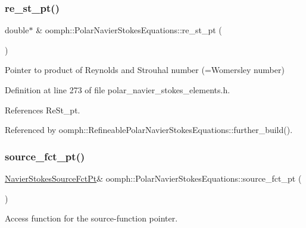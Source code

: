 \subsubsection{\texorpdfstring{re\+\_\+st\+\_\+pt()}{re\_st\_pt()}}
{\footnotesize\ttfamily double$\ast$ \& oomph\+::\+Polar\+Navier\+Stokes\+Equations\+::re\+\_\+st\+\_\+pt (\begin{DoxyParamCaption}{ }\end{DoxyParamCaption})\hspace{0.3cm}{\ttfamily [inline]}}



Pointer to product of Reynolds and Strouhal number (=Womersley number) 



Definition at line 273 of file polar\+\_\+navier\+\_\+stokes\+\_\+elements.\+h.



References Re\+St\+\_\+pt.



Referenced by oomph\+::\+Refineable\+Polar\+Navier\+Stokes\+Equations\+::further\+\_\+build().

\mbox{\label{classoomph_1_1PolarNavierStokesEquations_a81a9738dda601340f31fe0a3c6d4ceff}} 
\subsubsection{\texorpdfstring{source\+\_\+fct\+\_\+pt()}{source\_fct\_pt()}\hspace{0.1cm}{\footnotesize\ttfamily [1/2]}}
{\footnotesize\ttfamily \hyperlink{classoomph_1_1PolarNavierStokesEquations_a9084ecf962b26ccaa72443a807dedb25}{Navier\+Stokes\+Source\+Fct\+Pt}\& oomph\+::\+Polar\+Navier\+Stokes\+Equations\+::source\+\_\+fct\+\_\+pt (\begin{DoxyParamCaption}{ }\end{DoxyParamCaption})\hspace{0.3cm}{\ttfamily [inline]}}



Access function for the source-\/function pointer. 



